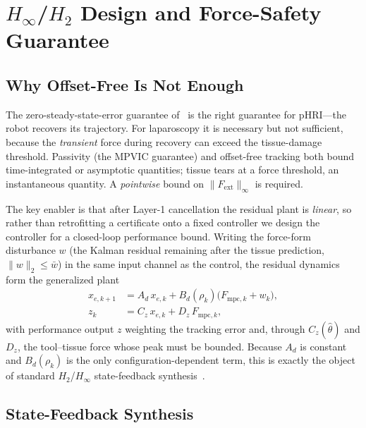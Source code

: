 \section{$H_\infty$/$H_2$ Design and Force-Safety Guarantee}\label{sec:hinf}

\subsection{Why Offset-Free Is Not Enough}

The zero-steady-state-error guarantee of~\cite{cao2026phri} is the right guarantee for pHRI---the robot recovers its trajectory. For laparoscopy it is necessary but not sufficient, because the \emph{transient} force during recovery can exceed the tissue-damage threshold. Passivity (the MPVIC guarantee) and offset-free tracking both bound time-integrated or asymptotic quantities; tissue tears at a force threshold, an instantaneous quantity. A \emph{pointwise} bound on $\|F_{\text{ext}}\|_\infty$ is required.

The key enabler is that after Layer-1 cancellation the residual plant is \emph{linear}, so rather than retrofitting a certificate onto a fixed controller we design the controller for a closed-loop performance bound. Writing the force-form disturbance $w$ (the Kalman residual remaining after the tissue prediction, $\|w\|_2\le\bar w$) in the same input channel as the control, the residual dynamics form the generalized plant
\begin{equation}
\begin{aligned}
x_{e,k+1}&=A_d\,x_{e,k}+B_d(\rho_k)\big(F_{\text{mpc},k}+w_k\big),\\
z_k&=C_z\,x_{e,k}+D_z\,F_{\text{mpc},k},
\end{aligned}
\label{eq:genplant}
\end{equation}
with performance output $z$ weighting the tracking error and, through $C_z(\hat\theta)$ and $D_z$, the tool--tissue force whose peak must be bounded. Because $A_d$ is constant and $B_d(\rho_k)$ is the only configuration-dependent term, this is exactly the object of standard $H_2$/$H_\infty$ state-feedback synthesis~\cite{boyd1994}.

\subsection{State-Feedback Synthesis}

